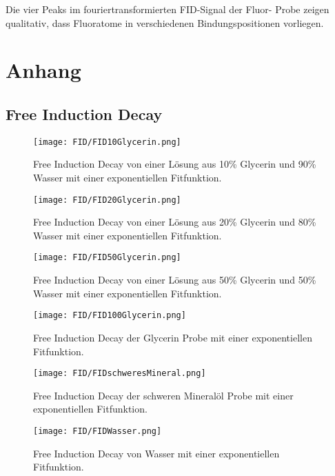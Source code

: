 \documentclass[10pt,twoside]{article}
\renewcommand{\1}{^{-1}}
\renewcommand{\2}{^{-2}}
\newcommand{\3}{^{-3}}
\newcommand{\4}{^{-4}}
\newcommand{\5}{^{-5}}
\newcommand{\6}{^{-6}}
\newcommand{\7}{^{-7}}
\newcommand{\8}{^{-8}}
\newcommand{\9}{^{-9}}
\begin{document}
Die vier Peaks im fouriertransformierten FID-Signal der Fluor- Probe zeigen qualitativ, dass Fluoratome in verschiedenen Bindungspositionen vorliegen.



\section{Anhang}
\subsection{Free Induction Decay}
\begin{figure}[H]
\centering
\texttt{[image: FID/FID10Glycerin.png]} 
\caption{Free Induction Decay von einer Lösung aus 10\% Glycerin und 90\% Wasser mit einer exponentiellen Fitfunktion.}
\end{figure}
\begin{figure}[H]
\centering
\texttt{[image: FID/FID20Glycerin.png]} 
\caption{Free Induction Decay von einer Lösung aus 20\% Glycerin und 80\% Wasser mit einer exponentiellen Fitfunktion.}
\end{figure}
\begin{figure}[H]
\centering
\texttt{[image: FID/FID50Glycerin.png]} 
\caption{Free Induction Decay von einer Lösung aus 50\% Glycerin und 50\% Wasser mit einer exponentiellen Fitfunktion.}
\end{figure}
\begin{figure}[H]
\centering
\texttt{[image: FID/FID100Glycerin.png]} 
\caption{Free Induction Decay der Glycerin Probe mit einer exponentiellen Fitfunktion.}
\end{figure}
\begin{figure}[H]
\centering
\texttt{[image: FID/FIDschweresMineral.png]} 
\caption{Free Induction Decay der schweren Mineralöl Probe mit einer exponentiellen Fitfunktion.}
\end{figure}
\begin{figure}[H]
\centering
\texttt{[image: FID/FIDWasser.png]} 
\caption{Free Induction Decay von Wasser mit einer exponentiellen Fitfunktion.}
\end{figure}
\end{document}
